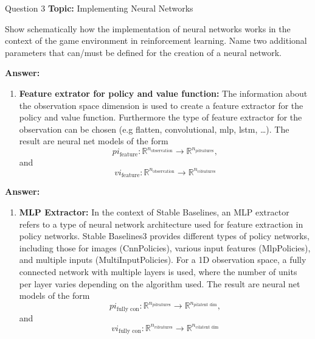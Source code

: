 \begin{frame}{Question 3}
    \textbf{Topic:} Implementing Neural Networks
    \vspace{10pt}

    Show schematically how the implementation of neural networks works in the context of the game environment in reinforcement learning. Name two additional parameters that can/must be defined for the creation of a neural network. 
\end{frame}
\begin{frame}
    \textbf{Answer:}
    \begin{enumerate}
        \item \textbf{Feature extrator for policy and value function:} The information about the observation space dimension is used to create a feature extractor for the policy and value function. Furthermore the type of feature extractor for the observation can be chosen (e.g flatten, convolutional, mlp, lstm, \dots). The result are neural net models of the form
        \[pi_{\text{feature}}: \mathbb{R}^{n_{\text{observation}}} \rightarrow \mathbb{R}^{n_{pi\text{features}}},\] and
        \[vi_{\text{feature}}: \mathbb{R}^{n_{\text{observation}}} \rightarrow \mathbb{R}^{n_{vi\text{features}}}\]
    \end{enumerate}
\end{frame}
\begin{frame}
    \textbf{Answer:}
    \begin{enumerate}[2.]
        \item \textbf{MLP Extractor:} In the context of Stable Baselines, an MLP extractor refers to a type of neural network architecture used for feature extraction in policy networks. Stable Baselines3 provides different types of policy networks, including those for images (CnnPolicies), various input features (MlpPolicies), and multiple inputs (MultiInputPolicies). For a 1D observation space, a fully connected network with multiple layers is used, where the number of units per layer varies depending on the algorithm used. The result are neural net models of the form
        \[pi_{\text{fully con}}: \mathbb{R}^{n_{pi \text{features}}} \rightarrow \mathbb{R}^{n_{pi \text{latent dim}}},\] and
        \[vi_{\text{fully con}}: \mathbb{R}^{n_{vi \text{features}}} \rightarrow \mathbb{R}^{n_{vi \text{latent dim}}}\]
    \end{enumerate}
\end{frame}
